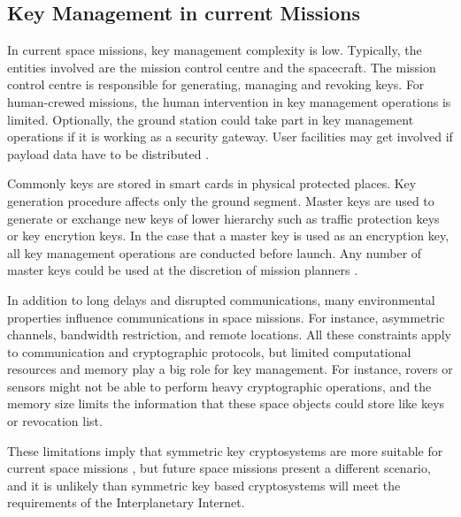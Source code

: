  



\subsection{Key Management in current Missions}

In current space missions, key management complexity is low.  Typically,  the entities involved are the mission control centre and the spacecraft. The mission control centre is responsible for generating, managing and revoking keys. For human-crewed missions, the human intervention in key management operations is limited. Optionally, the ground station could take part in key management operations if it is working as a security gateway. User facilities may get involved if payload data have to be distributed \cite{book2011space}. 


Commonly keys are stored in smart cards in physical protected places. Key generation procedure affects only the ground segment. Master keys are used to generate or exchange new keys of lower hierarchy such as traffic protection keys or key encrytion keys. In the case that a master key is used as an encryption key, all key management operations are conducted before launch. Any number of master keys could be used at the discretion of mission planners \cite{book2011space}.

In addition to long delays and disrupted communications, many environmental properties influence communications in space missions. For instance, asymmetric channels, bandwidth restriction, and remote locations. All these constraints apply to communication and cryptographic protocols, but limited computational resources and memory play a big role for key management. For instance, rovers or sensors might not be able to perform heavy cryptographic operations, and the memory size limits the information that these space objects could store like keys or revocation list.

These limitations imply that symmetric key cryptosystems are more suitable for current space missions \cite{book2011space}, but future space missions present a different scenario, and it is unlikely than symmetric key based cryptosystems will meet the requirements of the Interplanetary Internet.


